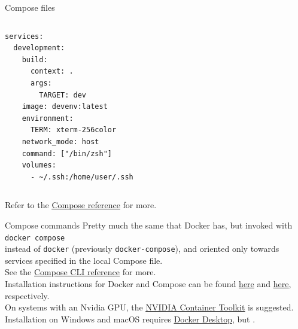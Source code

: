 \begin{frame}[fragile]{Compose files}
	\begin{columns}
		\begin{lstlisting}[language=compose, caption=Minimal example of a Compose file.]
services:
  development:
    build:
      context: .
      args:
        TARGET: dev
    image: devenv:latest
    environment:
      TERM: xterm-256color
    network_mode: host
    command: ["/bin/zsh"]
    volumes:
      - ~/.ssh:/home/user/.ssh
\end{lstlisting}
	\end{columns}
	Refer to the \href{https://docs.docker.com/compose/compose-file/}{\color{blue}\underline{Compose reference}} for more.
\end{frame}

\begin{frame}{Compose commands}
	Pretty much the same that Docker has, but invoked with\\
  \bigskip
	\texttt{docker compose}\\
  \bigskip
	instead of \texttt{docker} (previously \texttt{docker-compose}), and oriented only towards services specified in the local Compose file.\\
  \bigskip
	See the \href{https://docs.docker.com/compose/reference/}{\color{blue}\underline{Compose CLI reference}} for more.\\
  \bigskip
  Installation instructions for Docker and Compose can be found \href{https://docs.docker.com/engine/install/ubuntu/}{\color{blue}\underline{here}} and \href{https://docs.docker.com/compose/install/linux/}{\color{blue}\underline{here}}, respectively.\\
  On systems with an Nvidia GPU, the \href{https://docs.nvidia.com/datacenter/cloud-native/container-toolkit/overview.html}{\color{blue}\underline{NVIDIA Container Toolkit}} is suggested.\\
  Installation on Windows and macOS requires \href{https://www.docker.com/products/docker-desktop/}{\color{blue}\underline{Docker Desktop}}, but .
\end{frame}

